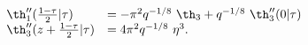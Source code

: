 \begin{equation}
  \begin{array}{ll}
    \th_1''({1-\tau\over 2} | \tau) &= -\pi^2 q^{-1/8} ~\th_3 +
    q^{-1/8}  ~\th_3''(0|\tau) \\
    \th_3''(z+{1-\tau\over 2} | \tau) &= 4\pi^2 q^{-1/8} ~\eta^3 .
  \end{array}
\end{equation}

